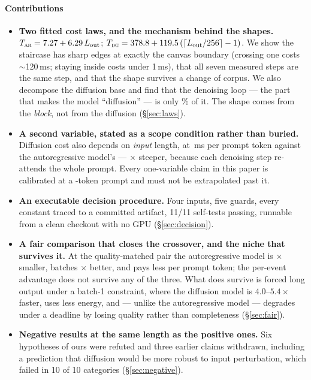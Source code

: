\paragraph{Contributions}
\begin{itemize}
  \item \textbf{Two fitted cost laws, and the mechanism behind the shapes.}
    $T_{\textsc{ar}} = 7.27 + 6.29\,L_{\mathrm{out}}$;
    $T_{\textsc{dg}} = 378.8 + 119.5\,(\lceil
    L_{\mathrm{out}}/256\rceil - 1)$. We show the staircase has
    sharp edges at exactly the canvas boundary (crossing one costs
    $\sim$120\,ms; staying inside costs under 1\,ms), that all seven measured
    steps are the same step, and that the shape survives a change of corpus.
    We also decompose the diffusion base and find that the denoising loop ---
    the part that makes the model ``diffusion'' --- is only \dgDenoisePct\% of
    it. The shape comes from the \emph{block}, not from the diffusion
    (\S\ref{sec:laws}).
  \item \textbf{A second variable, stated as a scope condition rather than
    buried.} Diffusion cost also depends on \emph{input} length, at
    \dgInputSlope\,ms per prompt token against the autoregressive model's
    \arInputSlope{} --- $\times$ steeper, because each denoising
    step re-attends the whole prompt. Every one-variable claim in this paper is
    calibrated at a -token prompt and must not be extrapolated past
    it.
  \item \textbf{An executable decision procedure.} Four inputs, five guards,
    every constant traced to a committed artifact, 11/11 self-tests passing,
    runnable from a clean checkout with no GPU (\S\ref{sec:decision}).
  \item \textbf{A fair comparison that closes the crossover, and the niche
    that survives it.} At the quality-matched pair the autoregressive model is
    \footprintRatio$\times$ smaller, batches \arBatchMult$\times$ better, and
    pays less per prompt token; the per-event advantage does not survive any
    of the three. What does survive is forced long output under a batch-1
    constraint, where the diffusion model is $4.0$--$5.4\times$ faster, uses
    less energy, and --- unlike the autoregressive model --- degrades under a
    deadline by losing quality rather than completeness (\S\ref{sec:fair}).
  \item \textbf{Negative results at the same length as the positive ones.} Six
    hypotheses of ours were refuted and three earlier claims withdrawn,
    including a prediction that diffusion would be more robust to input
    perturbation, which failed in 10 of 10 categories
    (\S\ref{sec:negative}).
\end{itemize}

